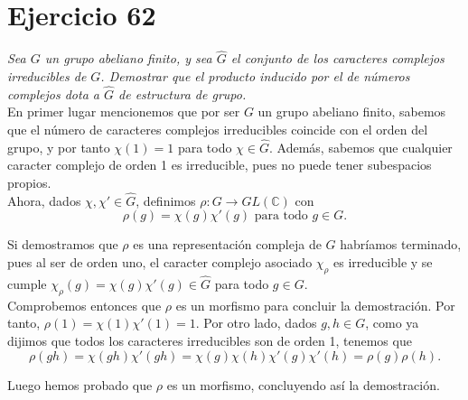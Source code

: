 \section{Ejercicio 62}%
\label{sec:ejercicio_62}

\textit{Sea \(G\) un grupo abeliano finito, y sea \(\widehat{G}\) el conjunto de los caracteres complejos irreducibles de \(G\). Demostrar que el producto inducido por el de números complejos dota a \(\widehat{G}\) de estructura de grupo.} \\

En primer lugar mencionemos que por ser \(G\) un grupo abeliano finito, sabemos que el número de caracteres complejos irreducibles coincide con el orden del grupo, y por tanto \(\chi(1) = 1\) para todo  \(\chi \in \widehat{G}\). Además, sabemos que cualquier caracter complejo de orden 1 es irreducible, pues no puede tener subespacios propios.  \\

Ahora, dados \(\chi, \chi' \in \widehat{G}\), definimos \(\rho: G \to GL(\mathbb{C})\) con
\[
\rho(g) = \chi(g) \chi'(g) \text{ para todo } g \in G
.\]

Si demostramos que \(\rho\) es una representación compleja de \(G\) habríamos terminado, pues al ser de orden uno, el caracter complejo asociado \(\chi_{\rho}\) es irreducible y se cumple \(\chi_{\rho}(g) = \chi(g) \chi'(g) \in \widehat{G}\) para todo \(g \in G\). \\

Comprobemos entonces que \(\rho\) es un morfismo para concluir la demostración.  Por tanto, \(\rho(1) = \chi(1)\chi'(1) = 1\). Por otro lado, dados \(g, h \in G\), como ya dijimos que todos los caracteres irreducibles son de orden 1, tenemos que
\[
\rho(gh) = \chi(gh) \chi'(gh) = \chi(g)\chi(h)\chi'(g)\chi'(h) = \rho(g)\rho(h)
.\]

Luego hemos probado que \(\rho\) es un morfismo, concluyendo así la demostración.
